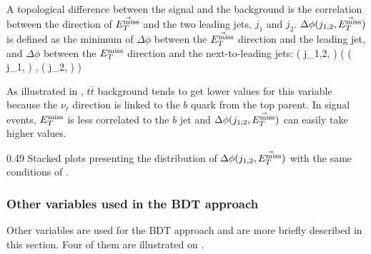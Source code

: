    A topological difference between the signal and the background is the correlation
    between the direction of $\vec{E_T^\text{miss}}$ and the two leading jets, $j_1$ and $j_2$.
    $\Delta \phi( j_{1,2}, \vec{E_T^\text{miss}} )$ is defined as the minimum of $\Delta \phi$
    between the $\vec{E_T^\text{miss}}$ direction and the leading jet, and $\Delta \phi$ between the
    $E_T^\text{miss}$ direction and the next-to-leading jets:
    {
        \Delta \phi( j_{1,2}, \vec{\MET} )
        (
            \Delta \phi( j_1, \vec{\MET} )
            ,
            \Delta \phi( j_2, \vec{\MET} )
        )
    }

    As illustrated in ,
    $t\bar{t}$ background tends to get lower values for this variable because the
    $\nu_{\ell}$ direction is linked to the $b$ quark from the top parent. In signal
    events, $E_T^\text{miss}$ is less correlated to the $b$ jet and $\Delta \phi( j_{1,2},
    \vec{E_T^\text{miss}} )$ can easily take higher values.

                 {0.49}
                 {Stacked plots presenting the distribution of $\Delta \phi( j_{1,2}, \vec{E_T^\text{miss}} )$
                 with the same conditions of .}

    \subsubsection{Other variables used in the BDT approach}

    Other variables are used for the BDT approach and are more briefly described in
    this section. Four of them are illustrated on .

